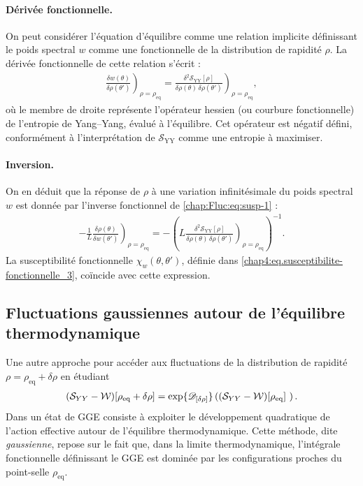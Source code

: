 \medskip
\paragraph{Dérivée fonctionnelle.}
On peut considérer l’équation d’équilibre comme une relation implicite définissant le poids spectral $w$ comme une fonctionnelle de la distribution de rapidité $\rho$. La dérivée fonctionnelle de cette relation s’écrit :
\begin{eqnarray}
	\left. \frac{\delta w(\theta)}{\delta \rho(\theta')} \right)_{\rho = \rho_{\mathrm{eq}}} = \left. \frac{\delta^2 \mathcal{S}_{\mathrm{YY}}[\rho]}{\delta \rho(\theta)\, \delta \rho(\theta')} \right)_{\rho = \rho_{\mathrm{eq}}}, \label{chap:Fluc:eq:susp-1}
\end{eqnarray}
où le membre de droite représente l’opérateur hessien (ou courbure fonctionnelle) de l'entropie de Yang–Yang, évalué à l’équilibre. Cet opérateur est négatif défini, conformément à l’interprétation de $\mathcal{S}_{\mathrm{YY}}$ comme une entropie à maximiser.

\paragraph{Inversion.}
On en déduit que la réponse de $\rho$ à une variation infinitésimale du poids spectral $w$ est donnée par l'inverse fonctionnel de \eqref{chap:Fluc:eq:susp-1} :
\begin{eqnarray}
	-\frac{1}{L} \left. \frac{\delta \rho(\theta)}{\delta w(\theta')} \right)_{\rho = \rho_{\mathrm{eq}}} = - \left( L \left. \frac{\delta^2 \mathcal{S}_{\mathrm{YY}}[\rho]}{\delta \rho(\theta)\, \delta \rho(\theta')} \right)_{\rho = \rho_{\mathrm{eq}}} \right)^{-1}. \label{chap:Fluc:eq:susp-2}
\end{eqnarray}
La susceptibilité fonctionnelle $\chi_w(\theta, \theta')$, définie dans \eqref{chap4:eq.susceptibilite-fonctionnelle_3}, coïncide avec cette expression.





\subsection{Fluctuations gaussiennes autour de l’équilibre thermodynamique}

Une autre approche pour accéder aux fluctuations de la distribution de rapidité $\rho = \rho_{\mathrm{eq}} + \delta \rho $  en étudiant 
\begin{eqnarray*}
	(\mathcal{S}_{YY} - \mathcal{W})[\rho_{\mathrm{eq}} + \delta \rho ]  = \exp \{\dfonc{\delta \rho }\}\left ( (\mathcal{S}_{YY} - \mathcal{W})[\rho_{\mathrm{eq}}] \right ).	
\end{eqnarray*}
Dans un état de GGE consiste à exploiter le développement quadratique de l’action effective autour de l’équilibre thermodynamique. Cette méthode, dite \emph{gaussienne}, repose sur le fait que, dans la limite thermodynamique, l’intégrale fonctionnelle définissant le GGE est dominée par les configurations proches du point-selle $\rho_{\mathrm{eq}}$.

